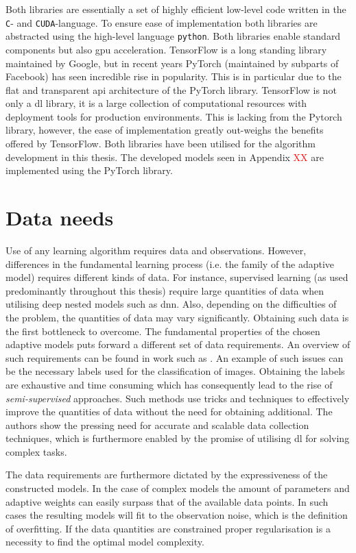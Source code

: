 Both libraries are essentially a set of highly efficient low-level code written in the \texttt{C}- and \texttt{CUDA}-language. To ensure ease of implementation both libraries are abstracted using the high-level language \texttt{python}. Both libraries enable standard components but also \gls{gpu} acceleration. TensorFlow is a long standing library maintained by Google, but in recent years PyTorch (maintained by subparts of Facebook) has seen incredible rise in popularity. This is in particular due to the flat and transparent \gls{api} architecture of the PyTorch library. TensorFlow is not only a \gls{dl} library, it is a large collection of computational resources with deployment tools for production environments. This is lacking from the Pytorch library, however, the ease of implementation greatly out-weighs the benefits offered by TensorFlow. Both libraries have been utilised for the algorithm development in this thesis. The developed models seen in Appendix \textcolor{red}{XX} are implemented using the PyTorch library.

\section{Data needs}

Use of any learning algorithm requires data and observations. However, differences in the fundamental learning process (i.e. the family of the adaptive model) requires different kinds of data. For instance, supervised learning (as used predominantly throughout this thesis) require large quantities of data when utilising deep nested models such as \gls{dnn}. Also, depending on the difficulties of the problem, the quantities of data may vary significantly. Obtaining such data is the first bottleneck to overcome. The fundamental properties of the chosen adaptive models puts forward a different set of data requirements. An overview of such requirements can be found in work such as \cite{RohAPerspective}. An example of such issues can be the necessary labels used for the classification of images. Obtaining the labels are exhaustive and time consuming which has consequently lead to the rise of \emph{semi-supervised} approaches. Such methods use tricks and techniques to effectively improve the quantities of data without the need for obtaining additional. The authors show the pressing need for accurate and scalable data collection techniques, which is furthermore enabled by the promise of utilising \gls{dl} for solving complex tasks. 

The data requirements are furthermore dictated by the expressiveness of the constructed models. In the case of complex models the amount of parameters and adaptive weights can easily surpass that of the available data points. In such cases the resulting models will fit to the observation noise, which is the definition of overfitting. If the data quantities are constrained proper regularisation is a necessity to find the optimal model complexity. 

